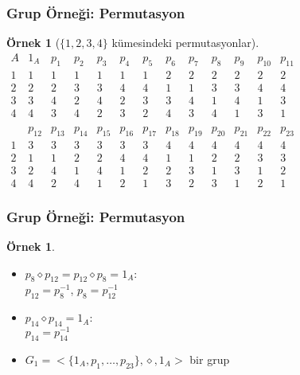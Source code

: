\documentclass[dvipsnames]{beamer}
\theoremstyle{definition}
\theoremstyle{example}
\newtheorem{ornek}[theorem]{Örnek}
\theoremstyle{plain}
\begin{document}
\begin{frame}
  \frametitle{Grup Örneği: Permutasyon}

  \begin{ornek}[$\{1,2,3,4\}$ kümesindeki permutasyonlar]
    $\begin{array}{c|cccccccccccccccccccccccc}
        A & 1_{A}  & p_{1}  & p_{2}  & p_{3}  & p_{4}  & p_{5}
          & p_{6}  & p_{7}  & p_{8}  & p_{9}  & p_{10} & p_{11}\\\hline
        1 &   1    &   1    &   1    &   1    &   1    &  1
          &   2    &   2    &   2    &   2    &   2    &  2\\
        2 &   2    &   2    &   3    &   3    &   4    &  4
          &   1    &   1    &   3    &   3    &   4    &  4\\
        3 &   3    &   4    &   2    &   4    &   2    &  3
          &   3    &   4    &   1    &   4    &   1    &  3\\
        4 &   4    &   3    &   4    &   2    &   3    &  2
          &   4    &   3    &   4    &   1    &   3    &  1\\\\
          & p_{12} & p_{13} & p_{14} & p_{15} & p_{16} & p_{17}
          & p_{18} & p_{19} & p_{20} & p_{21} & p_{22} & p_{23}\\\hline
        1 &   3    &   3    &   3    &   3    &   3    &  3
          &   4    &   4    &   4    &   4    &   4    &  4\\
        2 &   1    &   1    &   2    &   2    &   4    &  4
          &   1    &   1    &   2    &   2    &   3    &  3\\
        3 &   2    &   4    &   1    &   4    &   1    &  2
          &   2    &   3    &   1    &   3    &   1    &  2\\
        4 &   4    &   2    &   4    &   1    &   2    &  1
          &   3    &   2    &   3    &   1    &   2    &  1
      \end{array}$
  \end{ornek}
\end{frame}

\begin{frame}
  \frametitle{Grup Örneği: Permutasyon}

  \begin{ornek}
    \begin{itemize}
      \item $p_8 \diamond p_{12}=p_{12} \diamond p_8=1_A$:\\
        $p_{12} = p_8^{-1}$, $p_8 = p_{12}^{-1}$
      \item $p_{14} \diamond p_{14}=1_A$:\\
        $p_{14} = p_{14}^{-1}$

      \pause
      \bigskip
      \item $G_1=<\{1_A,p_1,\dots,p_{23}\},\diamond,1_A>$ bir grup
    \end{itemize}
  \end{ornek}
\end{frame}
\end{document}
